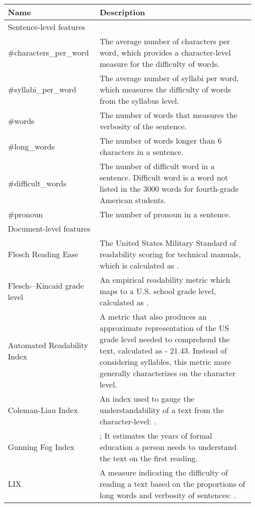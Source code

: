 \documentclass[runningheads]{llncs}
\begin{document}
  \begin{table*}[!h]
  	\centering
  	\scriptsize
  	\begin{tabular}{p{}|p{}}
  		{Name} & Description \\
  		\hline
  		\multicolumn{2}{l}{Sentence-level features}\\
  		\hline
  		\#characters\_per\_word &  The average number of characters per word, which provides a character-level measure for the difficulty of words. \\
  		\#syllabi\_per\_word & The average number of syllabi per word, which measures the difficulty of words from the syllabus level. \\
  		\#words& The number of words that measures the verbosity of the sentence. \\
\#long\_words &  The number of words longer than 6 characters in a sentence. \\
  	\#difficult\_words & The number of difficult word in a sentence. Difficult word is a word not listed in the 3000 words for fourth-grade American students.\\
  		\#pronoun & The number of pronoun in a sentence. \\
\hline
  		\multicolumn{2}{l}{Document-level features}  \\
  		\hline
  		Flesch Reading Ease~\cite{kincaid1975derivation} & The United States Military Standard of readability scoring for technical manuals, which is calculated as . \\
  		Flesch-–Kincaid grade level~\cite{kincaid1975derivation} & An empirical readability metric which maps to a U.S. school grade level, calculated as .\\
  		Automated Readability Index~\cite{senter1967automated} & A metric that also produces an approximate representation of the US grade level needed to comprehend the text, calculated as  - 21.43. Instead of considering syllables, this metric more generally characterizes on the character level.\\
  		Coleman-Liau Index~\cite{coleman1975computer} & An index used to gauge the understandability of a text from the character-level: .\\
  		Gunning Fog Index~\cite{gunning1969fog}& ; It estimates the years of formal education a person needs to understand the text on the first reading.\\
  		LIX~\cite{brown2005student} & A measure indicating the difficulty of reading a text based on the proportions of long words and verbosity of sentences: .\\

\end{tabular}
\end{table*}
\end{document}
